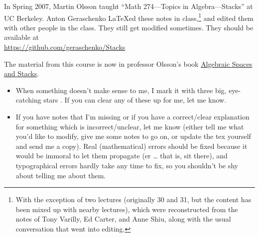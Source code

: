 
In Spring 2007, Martin Olsson taught ``Math 274---Topics in Algebra---Stacks'' at UC Berkeley. Anton Geraschenko \LaTeX ed these notes in class,\footnote{With the exception of two lectures (originally 30 and 31, but the content has been mixed up with nearby lectures), which were reconstructed from the notes of Tony Varilly, Ed Carter, and Anne Shiu, along with the usual conversation that went into editing.} and edited them with other people in the class. They still get modified sometimes. They should be available at\\
\url{https://github.com/geraschenko/Stacks}

The material from this course is now in professor Olsson's book \href{http://bookstore.ams.org/coll-62}{Algebraic Spaces and Stacks}.

\begin{itemize}
 \item When something doesn't make sense to me, I mark it with three
big, eye-catching
 stars . If you can clear any of these up for me,
let me know.

 \item If you have notes that I'm missing or
 if you have a correct/clear explanation for something which is
incorrect/unclear, let
 me know (either tell me what you'd like to modify, give me some
notes to go on, or
 update the tex yourself and send me a copy). Real (mathematical)
errors should be
 fixed because it would be immoral to let them propagate (er \dots
that is, sit there),
 and typographical errors hardly take any time to fix, so you
shouldn't be shy about
 telling me about them.
\end{itemize}
